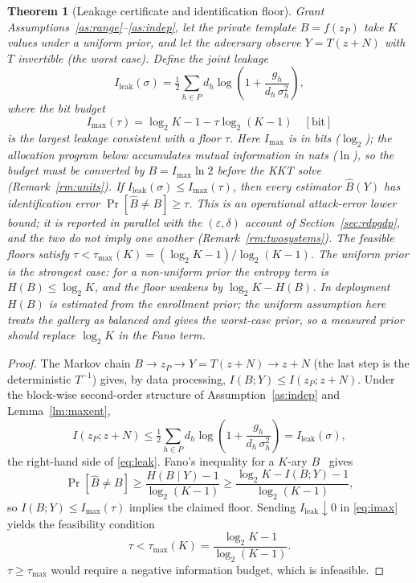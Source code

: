 \documentclass{ieeetj}
\theoremstyle{plain}
\newtheorem{theorem}{Theorem}
\theoremstyle{definition}
\begin{document}
\begin{theorem}[Leakage certificate and identification floor]
\label{th:certificate}
Grant Assumptions~\ref{as:range}--\ref{as:indep}, let the private template
$B=f(z_P)$ take $K$ values under a \emph{uniform} prior, and let the adversary
observe $Y=T(z+N)$ with $T$ invertible (the worst case). Define the joint
leakage
\begin{equation}
I_{\mathrm{leak}}(\sigma)
=\tfrac12\!\!\sum_{h\in P}\! d_h\log\!\left(1+\frac{g_h}{d_h\,\sigma_h^{2}}\right),
\label{eq:leak}
\end{equation}
where the bit budget
\begin{equation}
I_{\max}(\tau)=\log_2 K-1-\tau\log_2(K-1)\quad[\text{bit}]
\label{eq:imax}
\end{equation}
is the largest leakage consistent with a floor $\tau$. Here $I_{\max}$ is in
bits ($\log_2$); the allocation program below accumulates mutual information in
nats ($\ln$), so the budget must be converted by $B=I_{\max}\ln2$ before the
KKT solve (Remark~\ref{rm:units}). If
$I_{\mathrm{leak}}(\sigma)\le I_{\max}(\tau)$, then \emph{every} estimator
$\widehat B(Y)$ has identification error $\Pr[\widehat B\neq B]\ge\tau$. This
is an operational attack-error lower bound; it is reported in parallel with the
$(\varepsilon,\delta)$ account of Section~\ref{sec:rdpgdp}, and the two do not
imply one another (Remark~\ref{rm:twosystems}). The feasible floors satisfy
$\tau<\tau_{\max}(K)=(\log_2K-1)/\log_2(K-1)$.
The uniform prior is the strongest case: for a non-uniform prior the entropy
term is $H(B)\le\log_2K$, and the floor weakens by $\log_2K-H(B)$. In
deployment $H(B)$ is estimated from the enrollment prior; the uniform
assumption here treats the gallery as balanced and gives the worst-case prior,
so a measured prior should replace $\log_2K$ in the Fano term.
\end{theorem}

\begin{proof}
The Markov chain $B\to z_P\to Y=T(z+N)\to z+N$ (the last step is the
deterministic $T^{-1}$) gives, by data processing,
$I(B;Y)\le I(z_P;z+N)$. Under the block-wise second-order
structure of Assumption~\ref{as:indep} and Lemma~\ref{lm:maxent},
\begin{equation}
I(z_P;z+N)\le\tfrac12\!\!\sum_{h\in P}\! d_h\log\!\left(1+\frac{g_h}{d_h\,\sigma_h^{2}}\right)
= I_{\mathrm{leak}}(\sigma),
\label{eq:cert-bound}
\end{equation}
the right-hand side of \eqref{eq:leak}. Fano's inequality for a $K$-ary
$B$~\cite{fano} gives
\begin{equation}
\Pr[\widehat B\neq B]\ge\frac{H(B\mid Y)-1}{\log_2(K-1)}
\ge\frac{\log_2 K-I(B;Y)-1}{\log_2(K-1)},
\end{equation}
so $I(B;Y)\le I_{\max}(\tau)$ implies the claimed floor. Sending
$I_{\mathrm{leak}}\downarrow0$ in \eqref{eq:imax} yields the feasibility
condition
\begin{equation}
\tau<\tau_{\max}(K)=\frac{\log_2K-1}{\log_2(K-1)}.
\label{eq:taumax}
\end{equation}
$\tau\ge\tau_{\max}$ would require a negative information budget, which is
infeasible.
\end{proof}
\end{document}
